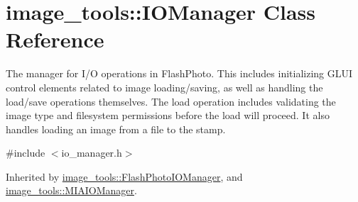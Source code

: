 \hypertarget{classimage__tools_1_1IOManager}{}\section{image\+\_\+tools\+:\+:I\+O\+Manager Class Reference}
\label{classimage__tools_1_1IOManager}


The manager for I/O operations in Flash\+Photo. This includes initializing G\+L\+UI control elements related to image loading/saving, as well as handling the load/save operations themselves. The load operation includes validating the image type and filesystem permissions before the load will proceed. It also handles loading an image from a file to the stamp.  




{\ttfamily \#include $<$io\+\_\+manager.\+h$>$}



Inherited by \hyperlink{classimage__tools_1_1FlashPhotoIOManager}{image\+\_\+tools\+::\+Flash\+Photo\+I\+O\+Manager}, and \hyperlink{classimage__tools_1_1MIAIOManager}{image\+\_\+tools\+::\+M\+I\+A\+I\+O\+Manager}.

